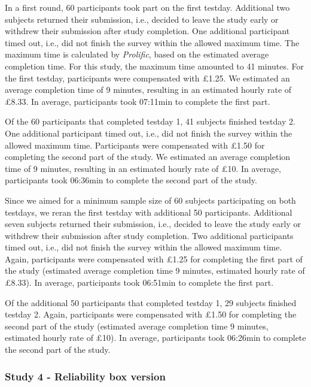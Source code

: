 \documentclass[
  man,floatsintext]{apa6}
\begin{document}
In a first round, 60 participants took part on the first testday. Additional two subjects returned their submission, i.e., decided to leave the study early or withdrew their submission after study completion. One additional participant timed out, i.e., did not finish the survey within the allowed maximum time. The maximum time is calculated by \emph{Prolific}, based on the estimated average completion time. For this study, the maximum time amounted to 41 minutes. For the first testday, participants were compensated with £1.25. We estimated an average completion time of 9 minutes, resulting in an estimated hourly rate of £8.33. In average, participants took 07:11min to complete the first part.

Of the 60 participants that completed testday 1, 41 subjects finished testday 2. One additional participant timed out, i.e., did not finish the survey within the allowed maximum time. Participants were compensated with £1.50 for completing the second part of the study. We estimated an average completion time of 9 minutes, resulting in an estimated hourly rate of £10. In average, participants took 06:36min to complete the second part of the study.

Since we aimed for a minimum sample size of 60 subjects participating on both testdays, we reran the first testday with additional 50 participants. Additional seven subjects returned their submission, i.e., decided to leave the study early or withdrew their submission after study completion. Two additional participants timed out, i.e., did not finish the survey within the allowed maximum time. Again, participants were compensated with £1.25 for completing the first part of the study (estimated average completion time 9 minutes, estimated hourly rate of £8.33). In average, participants took 06:51min to complete the first part.

Of the additional 50 participants that completed testday 1, 29 subjects finished testday 2. Again, participants were compensated with £1.50 for completing the second part of the study (estimated average completion time 9 minutes, estimated hourly rate of £10). In average, participants took 06:26min to complete the second part of the study.

\hypertarget{study-4---reliability-box-version}{%
\subsubsection{Study 4 - Reliability box version}\label{study-4---reliability-box-version}}
\end{document}
